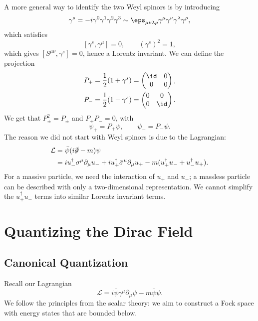 \documentclass[12pt]{article}
\begin{document}
A more general way to identify the two Weyl spinors is by introducing
\[
\gamma^s = -i \gamma^0 \gamma^{1} \gamma^{2} \gamma^{3} \sim \eps_{\mu\nu\lambda\rho} \gamma^{\mu} \gamma^{\nu} \gamma^{\lambda} \gamma^{\rho},
\]
which satisfies
\[
	[\gamma^{s}, \gamma^{\mu}] = 0, \qquad (\gamma^{s})^2 = 1,
\]
which gives $[S^{\mu\nu}, \gamma^{s}] = 0$, hence a Lorentz invariant. We can define the projection
\begin{align*}
	P_+ &= \frac 12 (1 + \gamma^{s}) =
	\begin{pmatrix}
		\id & 0 \\ 0 & 0
	\end{pmatrix}, \\
	P_- &= \frac 12 (1 - \gamma^{s}) =
	\begin{pmatrix}
		0 & 0 \\ 0 & \id
	\end{pmatrix}.
\end{align*}
We get that $P_{\pm}^2 = P_{\pm}$ and $P_+ P_- = 0$, with
\[
\psi_+ = P_+ \psi, \qquad \psi_- = P_- \psi.
\]
The reason we did not start with Weyl spinors is due to the Lagrangian:
\begin{align*}
	\mathcal{L} &= \bar \psi(i \slashed{\partial} - m) \psi \\
		    &= i u_-^{\dagger} \sigma^\mu \partial_\mu u_- + i u_+^{\dagger} \bar \sigma^{\mu} \partial_\mu u_+ - m (u_+^{\dagger} u_- + u_-^{\dagger} u_+).
\end{align*}
For a massive particle, we need the interaction of $u_+$ and $u_-$; a massless particle can be described with only a two-dimensional representation. We cannot simplify the $u_+^{\dagger} u_-$ terms into similar Lorentz invariant terms.

\newpage

\section{Quantizing the Dirac Field}%
\label{sec:qdf}

\subsection{Canonical Quantization}%
\label{sub:cq_dir}

Recall our Lagrangian
\[
\mathcal{L} = i \bar \psi \gamma^\mu \partial_\mu \psi - m \bar \psi \psi.
\]
We follow the principles from the scalar theory: we aim to construct a Fock space with energy states that are bounded below.
\end{document}
